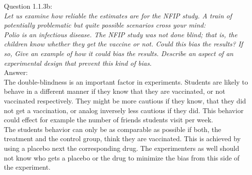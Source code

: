 
Question 1.1.3b:\\	
\textsl{Let us examine how reliable the estimates are for the NFIP study. A train of potentially problematic but quite possible scenarios cross your mind:\\Polio is an infectious disease. The NFIP study was not done blind; that is, the children know whether they get the vaccine or not. Could this bias the results? If so, Give an example of how it could bias the results. Describe an aspect of an experimental design that prevent this kind of bias.}\\

Answer:\\
The double-blindness is an important factor in experiments. Students are likely to behave in a different manner if they know that they are vaccinated, or not vaccinated respectively. They might be more cautious if they know, that they did not get a vaccination, or analog inversely less cautious if they did. This behavior could effect for example the number of friends students visit per week.\\

The students behavior can only be as comparable as possible if both, the treatment and the control group, think they are vaccinated. This is achieved by using a placebo next the corresponding drug. The experimenters as well should not know who gets a placebo or the drug to minimize the bias from this side of the experiment.\\